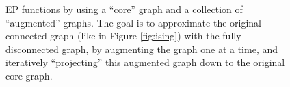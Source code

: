 \documentclass[times, 10pt,twocolumn]{article}
\begin{document}
\begin{figure}
\centering
  \caption{EP functions by using a ``core'' graph and a collection
  of ``augmented'' graphs. The goal is to approximate the original
  connected graph (like in Figure \ref{fig:ising}) with the fully
  disconnected graph, by augmenting the graph one at a time, and
  iteratively ``projecting'' this augmented graph down to the
  original core graph.}
  \label{fig:ep}
\end{figure}
\end{document}
